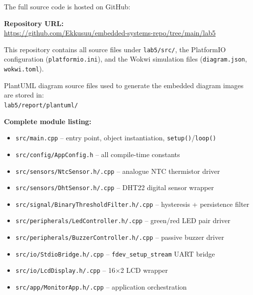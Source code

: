 \documentclass[12pt]{article}
\begin{document}
The full source code is hosted on GitHub:

\bigskip
\noindent\textbf{Repository URL:}\\
\url{https://github.com/Ekkusuu/embedded-systems-repo/tree/main/lab5}

\bigskip
\noindent This repository contains all source files under \texttt{lab5/src/}, the PlatformIO configuration (\texttt{platformio.ini}), and the Wokwi simulation files (\texttt{diagram.json}, \texttt{wokwi.toml}).

\bigskip
\noindent PlantUML diagram source files used to generate the embedded diagram images are stored in:\\
\texttt{lab5/report/plantuml/}

\bigskip
\noindent\textbf{Complete module listing:}
\begin{itemize}
    \item \texttt{src/main.cpp} -- entry point, object instantiation, \texttt{setup()}/\texttt{loop()}
    \item \texttt{src/config/AppConfig.h} -- all compile-time constants
    \item \texttt{src/sensors/NtcSensor.h/.cpp} -- analogue NTC thermistor driver
    \item \texttt{src/sensors/DhtSensor.h/.cpp} -- DHT22 digital sensor wrapper
    \item \texttt{src/signal/BinaryThresholdFilter.h/.cpp} -- hysteresis + persistence filter
    \item \texttt{src/peripherals/LedController.h/.cpp} -- green/red LED pair driver
    \item \texttt{src/peripherals/BuzzerController.h/.cpp} -- passive buzzer driver
    \item \texttt{src/io/StdioBridge.h/.cpp} -- \texttt{fdev\_setup\_stream} UART bridge
    \item \texttt{src/io/LcdDisplay.h/.cpp} -- 16$\times$2 LCD wrapper
    \item \texttt{src/app/MonitorApp.h/.cpp} -- application orchestration
\end{itemize}
\end{document}
